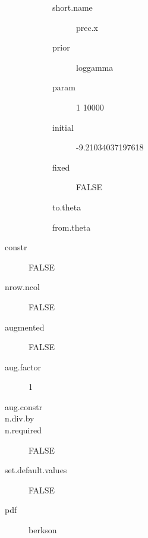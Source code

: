 \begin{description}
\begin{description}
\begin{description}
	 	 	 \item[ short.name ] prec.x 
	 	 	 \item[ prior ] loggamma 
	 	 	 \item[ param ] 1 10000 
	 	 	 \item[ initial ] -9.21034037197618 
	 	 	 \item[ fixed ] FALSE 
	 	 	 \item[ to.theta ] \verb|| 
	 	 	 \item[ from.theta ] \verb|| 
	 	 \end{description}
	 \end{description}
	 \item[ constr ] FALSE 
	 \item[ nrow.ncol ] FALSE 
	 \item[ augmented ] FALSE 
	 \item[ aug.factor ] 1 
	 \item[ aug.constr ]  
	 \item[ n.div.by ]  
	 \item[ n.required ] FALSE 
	 \item[ set.default.values ] FALSE 
	 \item[ pdf ] berkson 
\end{description}
